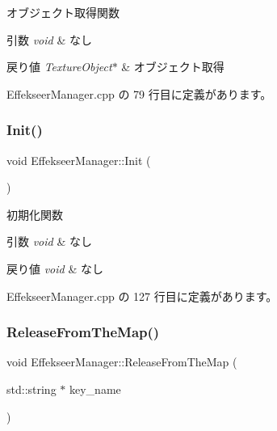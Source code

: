 オブジェクト取得関数 


\begin{DoxyParams}{引数}
{\em void} & なし \\
\hline
\end{DoxyParams}

\begin{DoxyRetVals}{戻り値}
{\em Texture\+Object$\ast$} & オブジェクト取得 \\
\hline
\end{DoxyRetVals}


 Effekseer\+Manager.\+cpp の 79 行目に定義があります。

\mbox{\label{class_effekseer_manager_aa59ee9fe8ea2968ff094366f9a648499}} 
\subsubsection{\texorpdfstring{Init()}{Init()}}
{\footnotesize\ttfamily void Effekseer\+Manager\+::\+Init (\begin{DoxyParamCaption}{ }\end{DoxyParamCaption})}



初期化関数 


\begin{DoxyParams}{引数}
{\em void} & なし \\
\hline
\end{DoxyParams}

\begin{DoxyRetVals}{戻り値}
{\em void} & なし \\
\hline
\end{DoxyRetVals}


 Effekseer\+Manager.\+cpp の 127 行目に定義があります。

\mbox{\label{class_effekseer_manager_a27e18219dc771e9d3cb6acb06b273ae8}} 
\subsubsection{\texorpdfstring{Release\+From\+The\+Map()}{ReleaseFromTheMap()}}
{\footnotesize\ttfamily void Effekseer\+Manager\+::\+Release\+From\+The\+Map (\begin{DoxyParamCaption}\item[{std\+::string $\ast$}]{key\+\_\+name }\end{DoxyParamCaption})}



